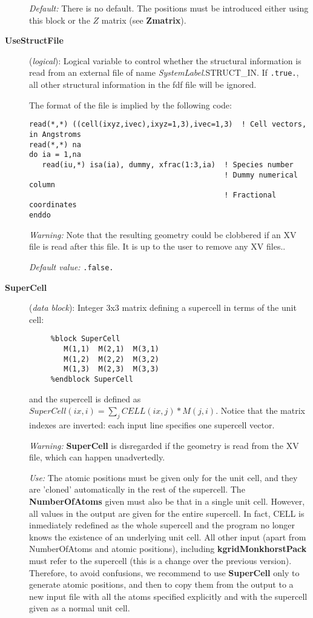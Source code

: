 \documentclass[11pt]{article}
\begin{document}
\begin{description}
{\it Default:} There is no default. The positions must be introduced
either using this block or the $Z$ matrix (see {\bf Zmatrix}).

\item[{\bf UseStructFile}] ({\it logical}): 
Logical variable to control whether the structural information
is read from an external file of name {\it SystemLabel}.STRUCT\_IN.
If \texttt{.true.}, all other structural information in the fdf file
will be ignored. 

The format of the file is implied by the following code:

\begin{verbatim}
read(*,*) ((cell(ixyz,ivec),ixyz=1,3),ivec=1,3)  ! Cell vectors, in Angstroms
read(*,*) na
do ia = 1,na
   read(iu,*) isa(ia), dummy, xfrac(1:3,ia)  ! Species number
                                             ! Dummy numerical column
                                             ! Fractional coordinates
enddo
\end{verbatim}

{\it Warning:} Note that the resulting geometry could be clobbered if
an XV file is read after this file. It is up to the user to remove
any XV files..

{\it Default value:} {\tt .false.}


\item[{\bf SuperCell}] ({\it data block}): 
Integer 3x3 matrix defining a supercell in terms of the unit cell: 

\begin{verbatim}
     %block SuperCell
        M(1,1)  M(2,1)  M(3,1) 
        M(1,2)  M(2,2)  M(3,2) 
        M(1,3)  M(2,3)  M(3,3) 
     %endblock SuperCell
\end{verbatim}

and the supercell is defined as
$SuperCell(ix,i) = \sum_j CELL(ix,j)*M(j,i)$.
Notice that the matrix indexes are inverted: each input line 
specifies one supercell vector.

{\it Warning:} {\bf SuperCell} is disregarded if the geometry is read from
the XV file, which can happen unadvertedly.

{\it Use:} The atomic positions must be given only for the unit cell,
and they are 'cloned' automatically in the rest of the supercell.
The {\bf NumberOfAtoms} given must also be that in a single unit cell.
However, all values in the output are given for the entire supercell. 
In fact, CELL is inmediately redefined as the whole supercell and the 
program no longer knows the existence of an underlying unit cell.
All other input (apart from NumberOfAtoms and atomic positions), 
including {\bf kgridMonkhorstPack} must refer to the supercell 
(this is a change over the previous version). Therefore, to avoid
confusions, we recommend to use {\bf SuperCell} only to
generate atomic positions, and then to copy them from the output
to a new input file with all the atoms specified explicitly and
with the supercell given as a normal unit cell.


\end{description}
\end{document}

